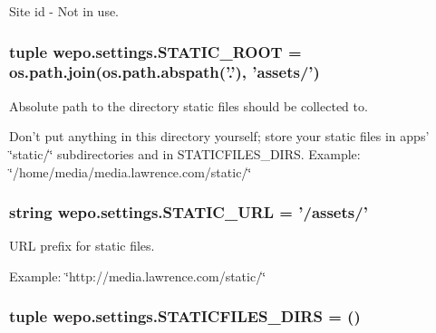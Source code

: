 Site id -\/ Not in use. 

\hypertarget{namespacewepo_1_1settings_a0283b3df49c3c6b7121437d5ad176d98}{
\subsubsection[{S\-T\-A\-T\-I\-C\-\_\-\-R\-O\-O\-T}]{\setlength{\rightskip}{0pt plus 5cm}tuple wepo.\-settings.\-S\-T\-A\-T\-I\-C\-\_\-\-R\-O\-O\-T = os.\-path.\-join(os.\-path.\-abspath('.'), 'assets/')}}\label{namespacewepo_1_1settings_a0283b3df49c3c6b7121437d5ad176d98}


Absolute path to the directory static files should be collected to. 

Don't put anything in this directory yourself; store your static files in apps' \char`\"{}static/\char`\"{} subdirectories and in S\-T\-A\-T\-I\-C\-F\-I\-L\-E\-S\-\_\-\-D\-I\-R\-S. Example\-: \char`\"{}/home/media/media.\-lawrence.\-com/static/\char`\"{} \hypertarget{namespacewepo_1_1settings_ad112fb1bf0c5dd90bf992a1b5fef807c}{
\subsubsection[{S\-T\-A\-T\-I\-C\-\_\-\-U\-R\-L}]{\setlength{\rightskip}{0pt plus 5cm}string wepo.\-settings.\-S\-T\-A\-T\-I\-C\-\_\-\-U\-R\-L = '/assets/'}}\label{namespacewepo_1_1settings_ad112fb1bf0c5dd90bf992a1b5fef807c}


U\-R\-L prefix for static files. 

Example\-: \char`\"{}http\-://media.\-lawrence.\-com/static/\char`\"{} \hypertarget{namespacewepo_1_1settings_a8104d031743dffd8e96120c9a41cbcbd}{
\subsubsection[{S\-T\-A\-T\-I\-C\-F\-I\-L\-E\-S\-\_\-\-D\-I\-R\-S}]{\setlength{\rightskip}{0pt plus 5cm}tuple wepo.\-settings.\-S\-T\-A\-T\-I\-C\-F\-I\-L\-E\-S\-\_\-\-D\-I\-R\-S = ()}}\label{namespacewepo_1_1settings_a8104d031743dffd8e96120c9a41cbcbd}


